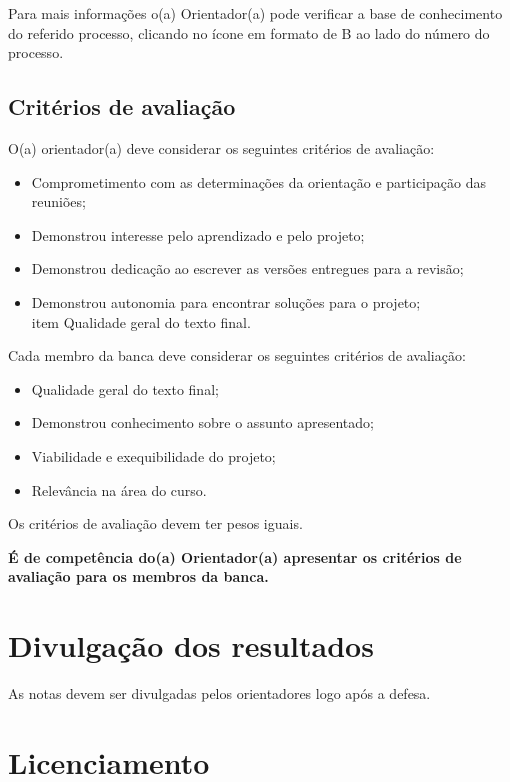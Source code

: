 \documentclass[a4paper, 12pt]{article}
\begin{document}
	Para mais informações o(a) Orientador(a) pode verificar a base de conhecimento do referido processo, clicando no ícone em formato de B ao lado do número do processo.
	
	\subsection{Critérios de avaliação}
	
	O(a) orientador(a) deve considerar os seguintes critérios de avaliação:
	
	\begin{itemize}
		\item Comprometimento com as determinações da orientação e participação das reuniões;
		\item Demonstrou interesse pelo aprendizado e pelo projeto;
		\item Demonstrou dedicação ao escrever as versões entregues para a revisão;
		\item Demonstrou autonomia para encontrar soluções para o projeto;
		\\item Qualidade geral do texto final.
	\end{itemize}

	Cada membro da banca deve considerar os seguintes critérios de avaliação:
	
	\begin{itemize}
		\item Qualidade geral do texto final;
		\item Demonstrou conhecimento sobre o assunto apresentado;
		\item Viabilidade e exequibilidade do projeto;
		\item Relevância na área do curso.
	\end{itemize}

	Os critérios de avaliação devem ter pesos iguais.

	\textbf{É de competência do(a) Orientador(a) apresentar os critérios de avaliação para os membros da banca.}	
	
	\section{Divulgação dos resultados}
	
	As notas devem ser divulgadas pelos orientadores logo após a defesa.
	
	\section{Licenciamento}
	
\end{document}
